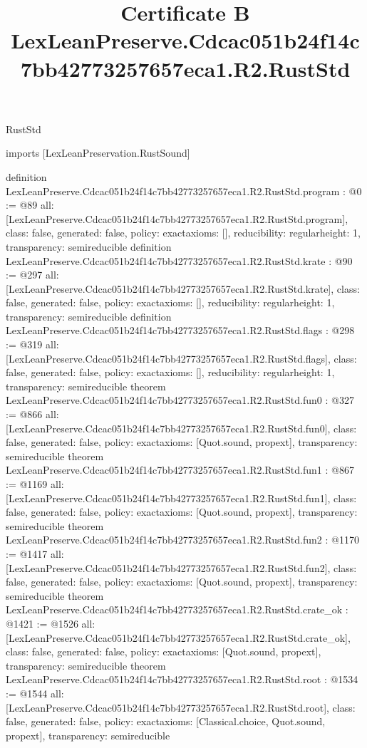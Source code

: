 \begin{lexlean}{RustStd}
\title{Certificate B LexLeanPreserve.Cdcac051b24f14c7bb42773257657eca1.R2.RustStd}
\begin{coremodule}
imports [LexLeanPreservation.RustSound]

definition LexLeanPreserve.Cdcac051b24f14c7bb42773257657eca1.R2.RustStd.program : @0 := @89 {
  all: [LexLeanPreserve.Cdcac051b24f14c7bb42773257657eca1.R2.RustStd.program],
  class: false,
  generated: false,
  policy: exact{axioms: []},
  reducibility: regular{height: 1},
  transparency: semireducible
}
definition LexLeanPreserve.Cdcac051b24f14c7bb42773257657eca1.R2.RustStd.krate : @90 := @297 {
  all: [LexLeanPreserve.Cdcac051b24f14c7bb42773257657eca1.R2.RustStd.krate],
  class: false,
  generated: false,
  policy: exact{axioms: []},
  reducibility: regular{height: 1},
  transparency: semireducible
}
definition LexLeanPreserve.Cdcac051b24f14c7bb42773257657eca1.R2.RustStd.flags : @298 := @319 {
  all: [LexLeanPreserve.Cdcac051b24f14c7bb42773257657eca1.R2.RustStd.flags],
  class: false,
  generated: false,
  policy: exact{axioms: []},
  reducibility: regular{height: 1},
  transparency: semireducible
}
theorem LexLeanPreserve.Cdcac051b24f14c7bb42773257657eca1.R2.RustStd.fun0 : @327 := @866 {
  all: [LexLeanPreserve.Cdcac051b24f14c7bb42773257657eca1.R2.RustStd.fun0],
  class: false,
  generated: false,
  policy: exact{axioms: [Quot.sound, propext]},
  transparency: semireducible
}
theorem LexLeanPreserve.Cdcac051b24f14c7bb42773257657eca1.R2.RustStd.fun1 : @867 := @1169 {
  all: [LexLeanPreserve.Cdcac051b24f14c7bb42773257657eca1.R2.RustStd.fun1],
  class: false,
  generated: false,
  policy: exact{axioms: [Quot.sound, propext]},
  transparency: semireducible
}
theorem LexLeanPreserve.Cdcac051b24f14c7bb42773257657eca1.R2.RustStd.fun2 : @1170 := @1417 {
  all: [LexLeanPreserve.Cdcac051b24f14c7bb42773257657eca1.R2.RustStd.fun2],
  class: false,
  generated: false,
  policy: exact{axioms: [Quot.sound, propext]},
  transparency: semireducible
}
theorem LexLeanPreserve.Cdcac051b24f14c7bb42773257657eca1.R2.RustStd.crate_ok : @1421 := @1526 {
  all: [LexLeanPreserve.Cdcac051b24f14c7bb42773257657eca1.R2.RustStd.crate_ok],
  class: false,
  generated: false,
  policy: exact{axioms: [Quot.sound, propext]},
  transparency: semireducible
}
theorem LexLeanPreserve.Cdcac051b24f14c7bb42773257657eca1.R2.RustStd.root : @1534 := @1544 {
  all: [LexLeanPreserve.Cdcac051b24f14c7bb42773257657eca1.R2.RustStd.root],
  class: false,
  generated: false,
  policy: exact{axioms: [Classical.choice, Quot.sound, propext]},
  transparency: semireducible
}


\end{coremodule}
\end{lexlean}
